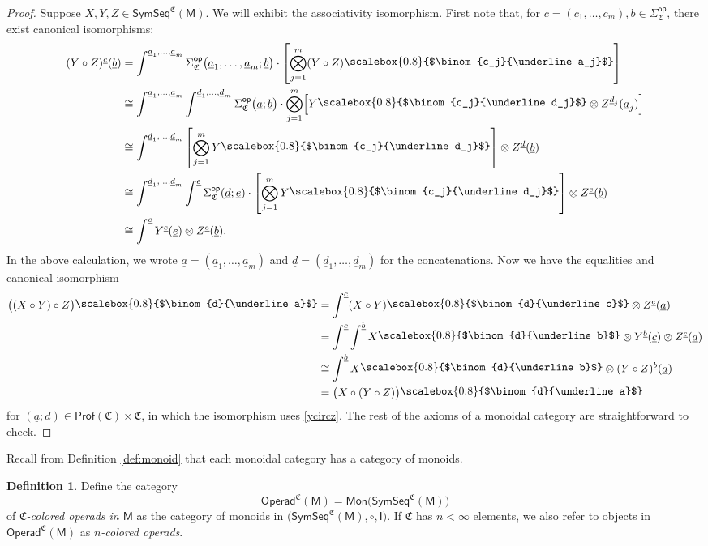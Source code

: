 \documentclass{amsbook}
\numberwithin{section}{chapter}
\numberwithin{subsection}{section}
\numberwithin{equation}{section}
\theoremstyle{plain}
\theoremstyle{definition}
\newtheorem{definition}[equation]{Definition}
\newcommand{\colorc}{\mathfrak{C}}
\newcommand{\Prof}{\mathsf{Prof}}
\newcommand{\Profc}{\Prof(\colorc)}
\newcommand{\Profcc}{\Profc \times \colorc}
\newcommand{\op}{\mathsf{op}}
\newcommand{\I}{\mathsf{I}}
\newcommand{\M}{\mathsf{M}}
\newcommand{\Mon}{\mathsf{Mon}}
\newcommand{\Operad}{\mathsf{Operad}}
\newcommand{\Operadc}{\Operad^{\colorc}}
\newcommand{\Operadcm}{\Operadc(\M)}
\newcommand{\Sigmaop}{\Sigma^{\op}}
\newcommand{\Sigmacop}{\Sigmaop_{\colorc}}
\newcommand{\symseq}{\mathsf{SymSeq}}
\newcommand{\symseqcm}{\symseq^{\colorc}(\M)}
\newcommand{\ua}{\underline a}
\newcommand{\ub}{\underline b}
\newcommand{\uc}{\underline c}
\newcommand{\ud}{\underline d}
\newcommand{\ue}{\underline e}
\newcommand{\smallprof}[1]
{\raisebox{.05cm}{\scalebox{0.8}{#1}}}
\newcommand{\cjuaj}{\smallprof{$\binom{c_j}{\ua_j}$}}
\newcommand{\cjudj}{\smallprof{$\binom{c_j}{\ud_j}$}}
\newcommand{\dua}{\smallprof{$\binom{d}{\ua}$}}
\newcommand{\dub}{\smallprof{$\binom{d}{\ub}$}}
\newcommand{\duc}{\smallprof{$\binom{d}{\uc}$}}
\begin{document}
\begin{proof}
Suppose $X,Y,Z \in \symseqcm$.  We will exhibit the associativity isomorphism.  First note that, for $\uc=(c_1,\ldots,c_m), \ub \in \Sigmacop$, there exist canonical isomorphisms:
\begin{equation}\label{ycircz}
\begin{split}(Y \circ Z)^{\uc}(\ub) 
&= \int^{\ua_1,\ldots,\ua_m} \Sigmacop\bigl(\ua_1,\ldots,\ua_m;\ub\bigr) \cdot \left[\bigotimes_{j=1}^m (Y\circ Z)\cjuaj\right]\\
&\cong \int^{\ua_1,\ldots,\ua_m} \int^{\ud_1,\ldots,\ud_m} \Sigmacop\bigl(\ua;\ub\bigr) \cdot \bigotimes_{j=1}^m \Bigl[Y\cjudj \otimes Z^{\ud_j}(\ua_j)\Bigr]\\
&\cong \int^{\ud_1,\ldots,\ud_m} \left[\bigotimes_{j=1}^m Y\cjudj\right] \otimes Z^{\ud}(\ub)\\
&\cong \int^{\ud_1,\ldots,\ud_m} \int^{\ue} \Sigmacop(\ud;\ue) \cdot \left[\bigotimes_{j=1}^m Y\cjudj\right] \otimes Z^{\ue}(\ub)\\
&\cong \int^{\ue} Y^{\uc}(\ue) \otimes Z^{\ue}(\ub).\end{split}
\end{equation}
In the above calculation, we wrote $\ua=(\ua_1,\ldots,\ua_m)$ and $\ud=(\ud_1,\ldots,\ud_m)$ for the concatenations.  Now we have the equalities and canonical isomorphism
\[\begin{split}
\bigl((X \circ Y) \circ Z\bigr)\dua 
&= \int^{\uc} (X \circ Y)\duc \otimes Z^{\uc}(\ua)\\
&= \int^{\uc} \int^{\ub} X\dub \otimes Y^{\ub}(\uc) \otimes Z^{\uc}(\ua)\\
&\cong \int^{\ub} X\dub \otimes (Y \circ Z)^{\ub}(\ua)\\
&= \bigl(X \circ (Y \circ Z)\bigr)\dua\end{split}\]
for $(\ua;d) \in \Profcc$, in which the isomorphism uses \eqref{ycircz}.  The rest of the axioms of a monoidal category are straightforward to check.
\end{proof}

Recall from Definition \ref{def:monoid} that each monoidal category has a category of monoids.

\begin{definition}\label{def:operad}
Define the category
\[\Operadcm = \Mon\bigl(\symseqcm\bigr)\]
of \emph{$\colorc$-colored operads in $\M$} as the category of monoids in $\bigl(\symseqcm,\circ,\I\bigr)$.  If $\colorc$ has $n<\infty$ elements, we also refer to objects in $\Operadcm$ as \emph{$n$-colored operads}.
\end{definition}
\end{document}
